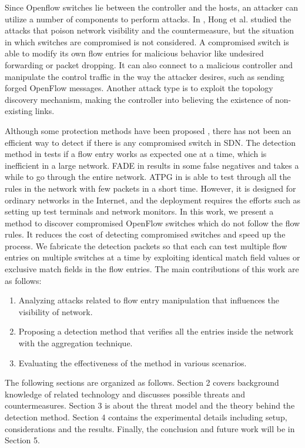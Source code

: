 \documentclass[conference]{IEEEtran}
\begin{document}
Since Openflow switches lie between the controller and the hosts, an attacker can utilize a number of components to perform attacks. In \cite{HXWG15}, Hong et al. studied the attacks that poison network visibility and the countermeasure, but the situation in which switches are compromised is not considered. A compromised switch is able to modify its own flow entries for malicious behavior like undesired forwarding or packet dropping. It can also connect to a malicious controller and manipulate the control traffic in the way the attacker desires, such as sending forged OpenFlow messages. Another attack type is to exploit the topology discovery mechanism, making the controller into believing the existence of non-existing links.

Although some protection methods have been proposed \cite{CKGL15,PJL16}, there has not been an efficient way to detect if there is any compromised switch in SDN. The detection method in \cite{CKGL15} tests if a flow entry works as expected one at a time, which is inefficient in a large network. FADE in \cite{PJL16} results in some false negatives and takes a while to go through the entire network. ATPG in \cite{ZKVM12} is able to test through all the rules in the network with few packets in a short time. However, it is designed for ordinary networks in the Internet, and the deployment requires the efforts such as setting up test terminals and network monitors. In this work, we present a method to discover compromised OpenFlow switches which do not follow the flow rules. It reduces the cost of detecting compromised switches and speed up the process. We fabricate the detection packets so that each can test multiple flow entries on multiple switches at a time by exploiting identical match field values or exclusive match fields in the flow entries. The main contributions of this work are as follows:

\begin{enumerate}
\item
Analyzing attacks related to flow entry manipulation that influences the visibility of network.
\item
Proposing a detection method that verifies all the entries inside the network with the aggregation technique.
\item
Evaluating the effectiveness of the method in various scenarios.
\end{enumerate}

The following sections are organized as follows. Section 2 covers background knowledge of related technology and discusses possible threats and countermeasures. Section 3 is about the threat model and the theory behind the detection method. Section 4 contains the experimental details including setup, considerations and the results. Finally, the conclusion and future work will be in Section 5.
\end{document}
